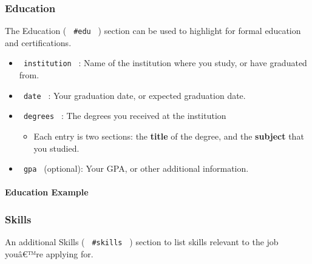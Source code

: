 \subsubsection{Education}\label{education}

The Education ( \texttt{\ \#edu\ } ) section can be used to highlight
for formal education and certifications.

\begin{itemize}
\tightlist
\item
  \texttt{\ institution\ } : Name of the institution where you study, or
  have graduated from.
\item
  \texttt{\ date\ } : Your graduation date, or expected graduation date.
\item
  \texttt{\ degrees\ } : The degrees you received at the institution

  \begin{itemize}
  \tightlist
  \item
    Each entry is two sections: the \textbf{title} of the degree, and
    the \textbf{subject} that you studied.
  \end{itemize}
\item
  \texttt{\ gpa\ } (optional): Your GPA, or other additional
  information.
\end{itemize}

\paragraph{Education Example}\label{education-example}

\begin{Shaded}
\begin{Highlighting}[]
\NormalTok{  ),}
\NormalTok{)}
\end{Highlighting}
\end{Shaded}

\subsubsection{Skills}\label{skills}

An additional Skills ( \texttt{\ \#skills\ } ) section to list skills
relevant to the job youâ€™re applying for.

